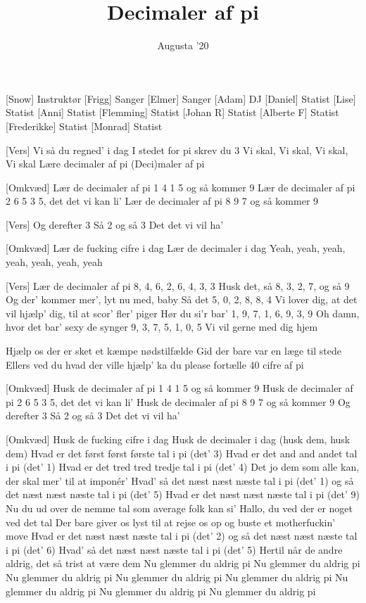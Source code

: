 \documentclass[a4paper,11pt]{article}
\title{Decimaler af pi}
\author{Augusta ’20}
\begin{document}
\maketitle

\begin{roles}
[Snow] Instruktør
[Frigg] Sanger
[Elmer] Sanger
[Adam] DJ
[Daniel] Statist
[Lise] Statist
[Anni] Statist
[Flemming] Statist
[Johan R] Statist
[Alberte F] Statist
[Frederikke] Statist
[Monrad] Statist
\end{roles}

\begin{song}


[Vers] Vi så du regned’ i dag
I stedet for pi skrev du 3
Vi skal,
Vi skal,
Vi skal,
Vi skal
Lære decimaler af pi
(Deci)maler af pi

[Omkvæd] Lær de decimaler af pi
1 4 1 5 og så kommer 9
Lær de decimaler af pi
2 6 5 3 5, det det vi kan li’
Lær de decimaler af pi
8 9 7 og så kommer 9

[Vers] Og derefter 3
Så 2 og så 3
Det det vi vil ha’

[Omkvæd] Lær de fucking cifre i dag
Lær de decimaler i dag
Yeah, yeah, yeah, yeah, yeah, yeah, yeah 

[Vers] Lær de decimaler af pi
8, 4, 6, 2, 6, 4, 3, 3
Husk det, så 8, 3, 2, 7, og så 9
Og der’ kommer mer’, lyt nu med, baby
Så det 5, 0, 2, 8, 8, 4
Vi lover dig, at det vil hjælp’ dig, til at scor’ fler’ piger
Hør du si’r bar’ 1, 9, 7, 1, 6, 9, 3, 9
Oh damn, hvor det bar’ sexy
de synger
9, 3, 7, 5, 1, 0, 5
Vi vil gerne med dig hjem

 Hjælp os der er sket et kæmpe nødstilfælde
Gid der bare var en læge til stede
Ellers ved du hvad der ville hjælp’ ka du
please fortælle
40 cifre af pi

[Omkvæd] Husk de decimaler af pi
1 4 1 5 og så kommer 9
Husk de decimaler af pi
2 6 5 3 5, det det vi kan li’
Husk de decimaler af pi
8 9 7 og så kommer 9
Og derefter 3
Så 2 og så 3
Det det vi vil ha’

[Omkvæd] Husk de fucking cifre i dag
Husk de decimaler i dag
(husk dem, husk dem)
Hvad er det først først første tal i pi (det’ 3)
Hvad er det and and andet tal i pi (det’ 1)
Hvad er det tred tred tredje tal i pi (det’ 4)
Det jo dem som alle kan, der skal mer’ til at imponér’
Hvad’ så det næst næst næste tal i pi (det’ 1)
og så det næst næst næste tal i pi (det’ 5)
Hvad er det næst næst næste tal i pi (det’ 9)
Nu du ud over de nemme tal som average folk kan si’
Hallo, du ved der er noget ved det tal
Der bare giver os lyst til at rejse os op og buste et
motherfuckin’ move
Hvad er det næst næst næste tal i pi (det’ 2)
og så det næst næst næste tal i pi (det’ 6)
Hvad’ så det næst næst næste tal i pi (det’ 5)
Hertil når de andre aldrig, det så trist at være dem
Nu glemmer du aldrig pi
Nu glemmer du aldrig pi
Nu glemmer du aldrig pi
Nu glemmer du aldrig pi
Nu glemmer du aldrig pi
Nu glemmer du aldrig pi
Nu glemmer du aldrig pi
Nu glemmer du aldrig pi

\end{song}
\end{document}
